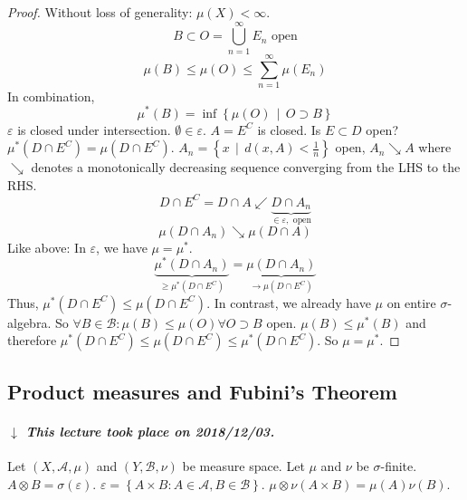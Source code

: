 \documentclass[a4paper]{article}
\numberwithin{lecref}{section}
\theoremstyle{break}
\newcommand{\dateref}[1]{%
  \begin{mdframed}[backgroundcolor=gray!10,innerbottommargin=0pt,innertopmargin=0pt]
    \paragraph{\textit{$\downarrow$ This lecture took place on #1.}}%
  \end{mdframed}%
}
\newcommand{\Set}[1]{\left\{#1\right\}}
\newcommand{\SetDef}[2]{\left\{#1\,\mid\,#2\right\}}
\begin{document}
\begin{proof}
  Without loss of generality: $\mu(X) < \infty$.
  \[ B \subset O = \bigcup_{n=1}^\infty E_n \text{ open} \]
  \[ \mu(B) \leq \mu(O) \leq \sum_{n=1}^\infty \mu(E_n) \]
  In combination,
  \[ \mu^*(B) = \inf\SetDef{\mu(O)}{O \supset B} \]
  $\varepsilon$ is closed under intersection. $\emptyset \in \varepsilon$.
  $A = E^C$ is closed. Is $E \subset D$ open? $\mu^*(D \cap E^C) = \mu(D \cap E^C)$.
  $A_n = \SetDef{x}{d(x, A) < \frac1n}$ open, $A_n \searrow A$
  where $\searrow$ denotes a monotonically decreasing sequence converging from the LHS to the RHS.
  \[ D \cap E^C = D \cap A \swarrow \underbrace{D \cap A_n}_{\in \varepsilon, \text{ open}} \]
  \[ \mu(D \cap A_n) \searrow \mu(D \cap A) \]
  Like above: In $\varepsilon$, we have $\mu = \mu^*$.
  \[ \underbrace{\mu^*(D \cap A_n)}_{\geq \mu^*(D \cap E^C)} = \underbrace{\mu(D \cap A_n)}_{\to \mu(D \cap E^C)} \]
  Thus, $\mu^*(D \cap E^C) \leq \mu(D \cap E^C)$.
  In contrast, we already have $\mu$ on entire $\sigma$-algebra. So $\forall B \in \mathcal B: \mu(B) \leq \mu(O) \forall O \supset B$ open. $\mu(B) \leq \mu^*(B)$ and therefore $\mu^*(D \cap E^C) \leq \mu(D \cap E^C) \leq \mu^*(D \cap E^C)$.
  So $\mu = \mu^*$.
\end{proof}

\subsection{Product measures and Fubini's Theorem}

\dateref{2018/12/03}

Let $(X, \mathcal A, \mu)$ and $(Y, \mathcal B, \nu)$ be measure space.
Let $\mu$ and $\nu$ be $\sigma$-finite.
$A \otimes B = \sigma(\varepsilon)$. $\varepsilon = \Set{A \times B: A \in \mathcal A, B \in \mathcal B}$.
$\mu \otimes \nu (A \times B) = \mu(A) \nu(B)$.
\end{document}
